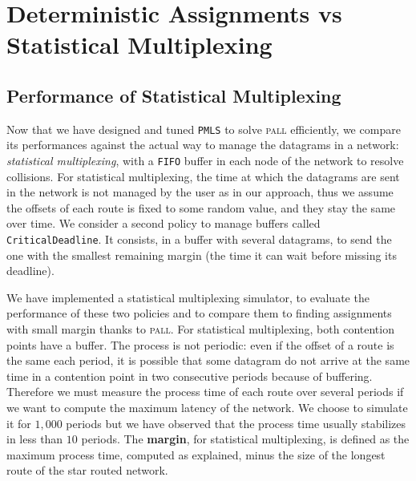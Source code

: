 \documentclass[a4paper,10pt]{article}
\newcommand\PMLS{\texttt{PMLS}\xspace}
\newcommand\FIFO{\texttt{FIFO}\xspace}
\newcommand\critdead{\texttt{CriticalDeadline}\xspace}
\newcommand\pall{\textsc{pall}\xspace}
\begin{document}
\section{Deterministic Assignments vs Statistical Multiplexing}\label{sec:comparison}

     \subsection{Performance of Statistical Multiplexing}

    
      Now that we have designed and tuned \PMLS to solve \pall efficiently, we compare its performances against the actual way to manage the datagrams in a network:  \emph{statistical multiplexing}, with a \FIFO buffer in each node of the network to resolve collisions. For statistical multiplexing, the time at which the datagrams are sent in the network is not managed by the user as in our approach, thus we assume the offsets of each route is fixed to some random value, and they stay the same over time.
     We consider a second policy to manage buffers called \critdead. It consists, in a buffer with several datagrams, to send the one with the smallest remaining margin (the time it can wait before missing its deadline).


  	We have implemented a statistical multiplexing simulator, to evaluate the performance of these two policies and to compare them to finding assignments with small margin thanks to \pall. 
  	For statistical multiplexing, both contention points have a buffer. The process is not periodic:
  	even if the offset of a route is the same each period, it is possible that some datagram do not arrive at the same time in a contention point in two consecutive periods because of buffering. Therefore we must measure the process time of each route over several periods if we want to compute the maximum latency of the network. We choose to simulate it for $1,000$ periods but we have observed that the process time usually stabilizes in less than $10$ periods. The \textbf{margin}, for statistical multiplexing, is defined as the maximum process time, computed as explained, minus the size of the longest route of the star routed network. 
	
\end{document}
